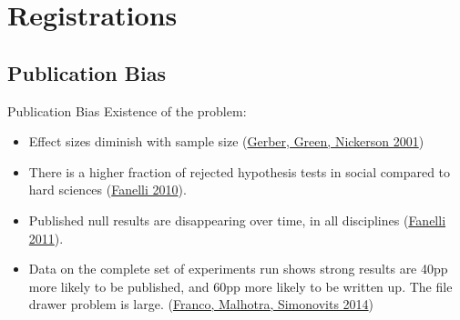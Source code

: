 \documentclass{beamer}
\begin{document}
\section{Registrations}

\subsection*{Publication Bias}
\begin{frame}{Publication Bias}%
  Existence of the problem:
  \begin{itemize}
  \item
 Effect sizes diminish with sample size (\href{http://pan.oxfordjournals.org/content/9/4/385.short}{Gerber, Green, Nickerson 2001})
  \item
  There is a higher fraction of rejected hypothesis tests in social compared to hard sciences (\href{http://journals.plos.org/plosone/article?id=10.1371/journal.pone.0010068}{Fanelli 2010}).
  \item
  	Published null results are disappearing over time, in all disciplines (\href{http://link.springer.com/article/10.1007/s11192-011-0494-7}{Fanelli 2011}). 
  \item
  	Data on the complete set of experiments run shows strong results are 40pp more likely to be published, and 60pp more likely to be written up. The file drawer problem is large. (\href{http://science.sciencemag.org/content/345/6203/1502}{Franco, Malhotra, Simonovits 2014})
  \end{itemize}
\end{frame}

\end{document}

